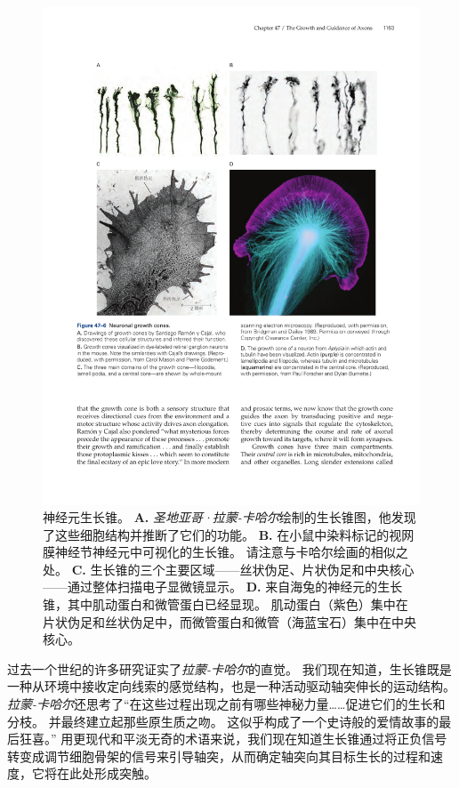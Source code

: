\begin{figure}[htbp]
	\centering
	\includegraphics[width=0.95\linewidth]{chap47/fig_47_6}
	\caption{神经元生长锥。
		\textbf{A.} \textit{圣地亚哥·拉蒙-卡哈尔}绘制的生长锥图，他发现了这些细胞结构并推断了它们的功能。
		\textbf{B.} 在小鼠中染料标记的视网膜神经节神经元中可视化的生长锥。
		请注意与卡哈尔绘画的相似之处。
		\textbf{C.} 生长锥的三个主要区域——丝状伪足、片状伪足和中央核心——通过整体扫描电子显微镜显示。
		\textbf{D.} 来自海兔的神经元的生长锥，其中肌动蛋白和微管蛋白已经显现。
		肌动蛋白（紫色）集中在片状伪足和丝状伪足中，而微管蛋白和微管（海蓝宝石）集中在中央核心。}
	\label{fig:47_6}
\end{figure}


过去一个世纪的许多研究证实了\textit{拉蒙-卡哈尔}的直觉。
我们现在知道，生长锥既是一种从环境中接收定向线索的感觉结构，也是一种活动驱动轴突伸长的运动结构。
\textit{拉蒙-卡哈尔}还思考了“在这些过程出现之前有哪些神秘力量……促进它们的生长和分枝。
并最终建立起那些原生质之吻。
这似乎构成了一个史诗般的爱情故事的最后狂喜。” 
用更现代和平淡无奇的术语来说，我们现在知道生长锥通过将正负信号转变成调节细胞骨架的信号来引导轴突，从而确定轴突向其目标生长的过程和速度，它将在此处形成突触。


